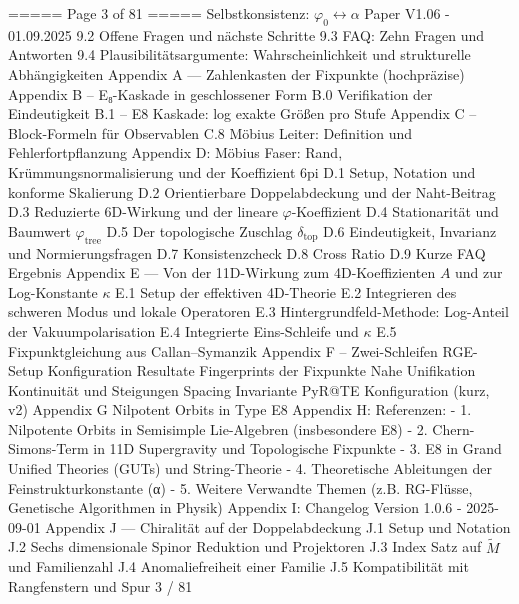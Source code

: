 \begin{MyVerbatim}
===== Page 3 of 81 =====
Selbstkonsistenz: $\varphi_{0}\leftrightarrow \alpha$
Paper V1.06 - 01.09.2025
9.2 Offene Fragen und nächste Schritte
9.3 FAQ: Zehn Fragen und Antworten
9.4 Plausibilitätsargumente: Wahrscheinlichkeit und strukturelle Abhängigkeiten
Appendix A — Zahlenkasten der Fixpunkte (hochpräzise)
Appendix B – E₈-Kaskade in geschlossener Form
B.0 Verifikation der Eindeutigkeit
B.1 – E8 Kaskade: log exakte Größen pro Stufe
Appendix C – Block-Formeln für Observablen
C.8 Möbius Leiter: Definition und Fehlerfortpflanzung
Appendix D: Möbius Faser: Rand, Krümmungsnormalisierung und der Koeffizient 6pi
D.1 Setup, Notation und konforme Skalierung
D.2 Orientierbare Doppelabdeckung und der Naht-Beitrag
D.3 Reduzierte 6D-Wirkung und der lineare $\varphi$-Koeffizient
D.4 Stationarität und Baumwert $\varphi_{\text{tree}}$
D.5 Der topologische Zuschlag $\delta_{\text{top}}$
D.6 Eindeutigkeit, Invarianz und Normierungsfragen
D.7 Konsistenzcheck
D.8 Cross Ratio
D.9 Kurze FAQ
Ergebnis
Appendix E — Von der 11D-Wirkung zum 4D-Koeffizienten $A$ und zur Log-Konstante $\kappa$
E.1 Setup der effektiven 4D-Theorie
E.2 Integrieren des schweren Modus und lokale Operatoren
E.3 Hintergrundfeld-Methode: Log-Anteil der Vakuumpolarisation
E.4 Integrierte Eins-Schleife und $\kappa$
E.5 Fixpunktgleichung aus Callan–Symanzik
Appendix F – Zwei-Schleifen RGE-Setup
Konfiguration
Resultate
Fingerprints der Fixpunkte
Nahe Unifikation
Kontinuität und Steigungen
Spacing Invariante
PyR@TE Konfiguration (kurz, v2)
Appendix G Nilpotent Orbits in Type E8
Appendix H: Referenzen:
- 1. Nilpotente Orbits in Semisimple Lie-Algebren (insbesondere E8)
- 2. Chern-Simons-Term in 11D Supergravity und Topologische Fixpunkte
- 3. E8 in Grand Unified Theories (GUTs) und String-Theorie
- 4. Theoretische Ableitungen der Feinstrukturkonstante (α)
- 5. Weitere Verwandte Themen (z.B. RG-Flüsse, Genetische Algorithmen in Physik)
Appendix I: Changelog
Version 1.0.6 - 2025-09-01
Appendix J — Chiralität auf der Doppelabdeckung
J.1 Setup und Notation
J.2 Sechs dimensionale Spinor Reduktion und Projektoren
J.3 Index Satz auf $\widetilde M$ und Familienzahl
J.4 Anomaliefreiheit einer Familie
J.5 Kompatibilität mit Rangfenstern und Spur 3 / 81


\end{MyVerbatim}

